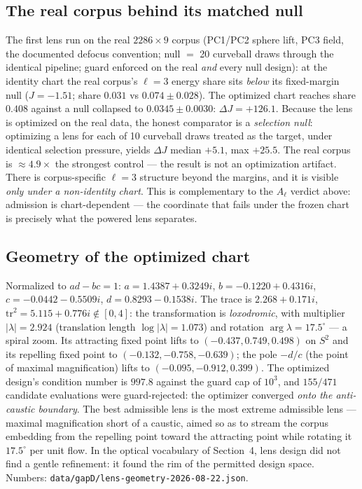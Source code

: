 \documentclass[11pt,a4paper]{article}
\theoremstyle{plain}
\theoremstyle{remark}
\begin{document}
\subsection{The real corpus behind its matched null}
The first lens run on the real $2286\times 9$ corpus (PC1/PC2 sphere lift, PC3 field, the documented defocus convention; null $=$ 20 curveball draws through the identical pipeline; guard enforced on the real \emph{and} every null design): at the identity chart the real corpus's $\ell{=}3$ energy share sits \emph{below} its fixed-margin null ($J = -1.51$; share $0.031$ vs $0.074 \pm 0.028$). The optimized chart reaches share $0.408$ against a null collapsed to $0.0345 \pm 0.0030$: $\Delta J = +126.1$. Because the lens is optimized on the real data, the honest comparator is a \emph{selection null}: optimizing a lens for each of 10 curveball draws treated as the target, under identical selection pressure, yields $\Delta J$ median $+5.1$, max $+25.5$. The real corpus is $\approx 4.9\times$ the strongest control --- the result is not an optimization artifact. There is corpus-specific $\ell{=}3$ structure beyond the margins, and it is visible \emph{only under a non-identity chart}. This is complementary to the $A_\ell$ verdict above: admission is chart-dependent --- the coordinate that fails under the frozen chart is precisely what the powered lens separates.

\subsection{Geometry of the optimized chart}
Normalized to $ad - bc = 1$: $a = 1.4387 + 0.3249i$, $b = -0.1220 + 0.4316i$, $c = -0.0442 - 0.5509i$, $d = 0.8293 - 0.1538i$. The trace is $2.268 + 0.171i$, $\mathrm{tr}^2 = 5.115 + 0.776i \notin [0,4]$: the transformation is \emph{loxodromic}, with multiplier $|\lambda| = 2.924$ (translation length $\log|\lambda| = 1.073$) and rotation $\arg\lambda = 17.5^{\circ}$ --- a spiral zoom. Its attracting fixed point lifts to $(-0.437, 0.749, 0.498)$ on $S^2$ and its repelling fixed point to $(-0.132, -0.758, -0.639)$; the pole $-d/c$ (the point of maximal magnification) lifts to $(-0.095, -0.912, 0.399)$. The optimized design's condition number is $997.8$ against the guard cap of $10^3$, and $155/471$ candidate evaluations were guard-rejected: the optimizer converged \emph{onto the anti-caustic boundary}. The best admissible lens is the most extreme admissible lens --- maximal magnification short of a caustic, aimed so as to stream the corpus embedding from the repelling point toward the attracting point while rotating it $17.5^{\circ}$ per unit flow. In the optical vocabulary of Section~4, lens design did not find a gentle refinement: it found the rim of the permitted design space. Numbers: \texttt{data/gapD/lens-geometry-2026-08-22.json}.
\end{document}
